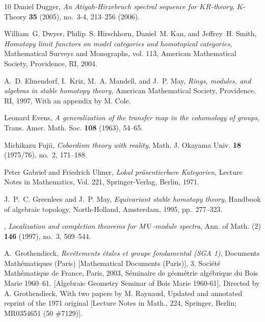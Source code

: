 \documentclass{amsart}
\theoremstyle{definition}
\theoremstyle{remark}
\begin{document}
\begin{thebibliography}{10}
Daniel Dugger, \emph{An {A}tiyah-{H}irzebruch spectral sequence for
  {$KR$}-theory}, $K$-Theory \textbf{35} (2005), no.~3-4, 213--256 (2006).

William~G. Dwyer, Philip~S. Hirschhorn, Daniel~M. Kan, and Jeffrey~H. Smith,
  \emph{Homotopy limit functors on model categories and homotopical
  categories}, Mathematical Surveys and Monographs, vol. 113, American
  Mathematical Society, Providence, RI, 2004. 

A.~D. Elmendorf, I.~Kriz, M.~A. Mandell, and J.~P. May, \emph{Rings, modules,
  and algebras in stable homotopy theory}, American Mathematical Society,
  Providence, RI, 1997, With an appendix by M. Cole. 

Leonard Evens, \emph{A generalization of the transfer map in the cohomology of
  groups}, Trans. Amer. Math. Soc. \textbf{108} (1963), 54--65. 

Michikazu Fujii, \emph{Cobordism theory with reality}, Math. J. Okayama Univ.
  \textbf{18} (1975/76), no.~2, 171--188. 

Peter Gabriel and Friedrich Ulmer, \emph{Lokal pr\"asentierbare {K}ategorien},
  Lecture Notes in Mathematics, Vol. 221, Springer-Verlag, Berlin, 1971.

J.~P.~C. Greenlees and J.~P. May, \emph{Equivariant stable homotopy theory},
  Handbook of algebraic topology, North-Holland, Amsterdam, 1995, pp.~277--323.

\bysame, \emph{Localization and completion theorems for {$M{\rm U}$}-module
  spectra}, Ann. of Math. (2) \textbf{146} (1997), no.~3, 509--544.

A.~Grothendieck, \emph{Rev\^etements \'etales et groupe fondamental ({SGA} 1)},
  Documents Math\'ematiques (Paris) [Mathematical Documents (Paris)], 3,
  Soci\'et\'e Math\'ematique de France, Paris, 2003, S{\'e}minaire de
  g{\'e}om{\'e}trie alg{\'e}brique du Bois Marie 1960--61. [Algebraic Geometry
  Seminar of Bois Marie 1960-61], Directed by A. Grothendieck, With two papers
  by M. Raynaud, Updated and annotated reprint of the 1971 original [Lecture
  Notes in Math., 224, Springer, Berlin; MR0354651 (50 \#7129)]. 


\end{thebibliography}
\end{document}
